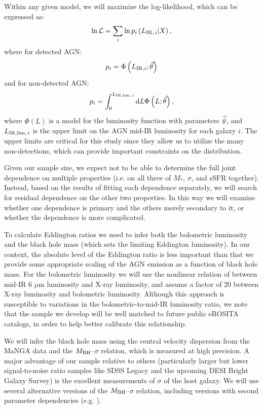 \documentclass[12pt, preprint]{hacked-aastex}
\begin{document}
Within any given model, we will maximize the log-likelihood, which can
be expressed as:
\begin{equation}
\ln \mathcal{L} = \sum_i \ln p_i\left(L_{{\rm IR},\,i}  | X\right),
\end{equation}
where for detected AGN:
\begin{equation}
p_i = \Phi\left(L_{{\rm IR}, i}; \vec{\theta} \right)
\end{equation}
and for non-detected AGN:
\begin{equation}
p_i = \int_0^{L_{{\rm IR, lim},\,i}} {\rm d}L \Phi\left(L; \vec{\theta}\right),
\end{equation}
where $\Phi(L)$ is a model for the luminosity function with
parameters $\vec{\theta}$, and $L_{{\rm IR, lim},\,i}$ is the upper limit 
on the AGN mid-IR luminosity for each galaxy $i$.
The upper limits are critical for this study since they allow
us to utilize the many non-detections, which can provide important
constraints on the distribution.

Given our sample size, we expect not to be able to determine the full
joint dependence on multiple properties (i.e. on all three of
$M_\ast$, $\sigma$, and sSFR together). Instead, based on the results
of fitting each dependence separately, we will search for residual
dependence on the other two properties. In this way we will examine
whether one dependence is primary and the others merely secondary to
it, or whether the dependence is more complicated.

To calculate Eddington ratios we need to infer both the bolometric
luminosity and the black hole mass (which sets the limiting Eddington
luminosity). In our context, the absolute level of the Eddington ratio
is less important than that we provide some appropriate scaling of the
AGN emission as a function of black hole mass.  For the bolometric
luminosity we will use the nonlinear relation of \cite{stern15a}
between mid-IR 6 $\mu$m luminosity and X-ray luminosity, and assume a
factor of 20 between X-ray luminosity and bolometric
luminosity. Although this approach is susceptible to variations in the
bolometric-to-mid-IR luminosity ratio, we note that the sample we
develop will be well matched to future public eROSITA catalogs, in
order to help better calibrate this relationship.

We will infer the black hole mass using the central velocity
dispersion from the MaNGA data and the $M_{\rm BH}$--$\sigma$
relation, which is measured at high precision.  A major advantage of
our sample relative to others (particularly larger but lower
signal-to-noise ratio samples like SDSS Legacy and the upcoming DESI
Bright Galaxy Survey) is the excellent measurements of $\sigma$ of the
host galaxy. We will use several alternative versions of the $M_{\rm
  BH}$--$\sigma$ relation, including versions with second parameter
dependencies (e.g. \cite{beifiori12a, kormendy13a, vandenbosch16a, shankar19a}).
\end{document}
